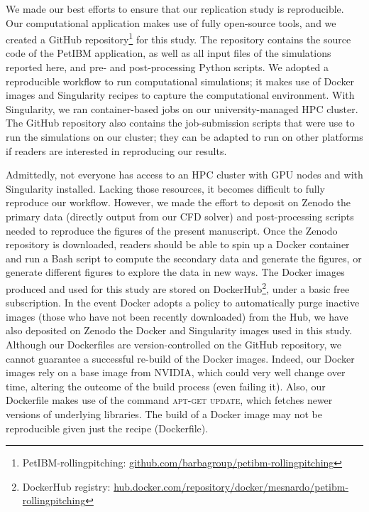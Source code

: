 We made our best efforts to ensure that our replication study is reproducible.
Our computational application makes use of fully open-source tools, and
we created a GitHub repository\footnote{PetIBM-rollingpitching: \url{github.com/barbagroup/petibm-rollingpitching}} for this study.
The repository contains the source code of the PetIBM application, as well as all input files of the simulations reported here, and pre- and post-processing Python scripts.
We adopted a reproducible workflow to run computational simulations; it makes use of Docker images and Singularity recipes to capture the computational environment.
With Singularity, we ran container-based jobs on our university-managed HPC cluster.
The GitHub repository also contains the job-submission scripts that were use to run the simulations on our cluster; they can be adapted to run on other platforms if readers are interested in reproducing our results.

Admittedly, not everyone has access to an HPC cluster with GPU nodes and with Singularity installed.
Lacking those resources, it becomes difficult to fully reproduce our workflow.
However, we made the effort to deposit on Zenodo\supercite{mesnard_barba_2021_zenodo_repropacks} the primary data (directly output from our CFD solver) and post-processing scripts needed to reproduce the figures of the present manuscript.
Once the Zenodo repository is downloaded, readers should be able to spin up a Docker container and run a Bash script to compute the secondary data and generate the figures,
or generate different figures to explore the data in new ways.
The Docker images produced and used for this study are stored on DockerHub\footnote{DockerHub registry: \url{hub.docker.com/repository/docker/mesnardo/petibm-rollingpitching}}, under a basic free subscription.
In the event Docker adopts a policy to automatically purge inactive images (those who have not been recently downloaded) from the Hub, we have also deposited on Zenodo the Docker and Singularity images used in this study.\supercite{mesnard_barba_2021_zenodo_images}
Although our Dockerfiles are version-controlled on the GitHub repository, we cannot guarantee a successful re-build of the Docker images.
Indeed, our Docker images rely on a base image from NVIDIA, which could very well change over time, altering the outcome of the build process (even failing it).
Also, our Dockerfile makes use of the command \textsc{apt-get update}, which fetches newer versions of underlying libraries.
The build of a Docker image may not be reproducible given just the recipe (Dockerfile).

